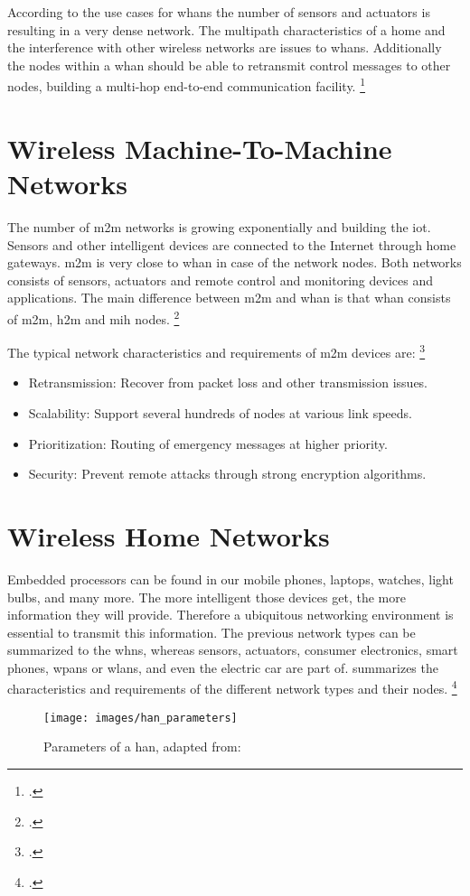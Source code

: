 According to the use cases for \glspl{whan} the number of sensors and actuators is resulting in a very dense network. The multipath characteristics of a home and the interference with other wireless networks are issues to \glspl{whan}. Additionally the nodes within a \gls{whan} should be able to retransmit control messages to other nodes, building a multi-hop end-to-end communication facility. \footcite[Cf.][]{Gomez2010}

\section{Wireless Machine-To-Machine Networks}

The number of \gls{m2m} networks is growing exponentially and building the \gls{iot}. Sensors and other intelligent devices are connected to the Internet through home gateways. \gls{m2m} is very close to \gls{whan} in case of the network nodes. Both networks consists of sensors, actuators and remote control and monitoring devices and applications. The main difference between \gls{m2m} and \gls{whan} is that \gls{whan} consists of \gls{m2m}, \gls{h2m} and \gls{mih} nodes. \footcite[Cf.][]{Jara2013}

The typical network characteristics and requirements of \gls{m2m} devices are: \footcite[Cf.][]{Minoli2013}

\begin{itemize}
  \item Retransmission: Recover from packet loss and other transmission issues.
  \item Scalability: Support several hundreds of nodes at various link speeds.
  \item Prioritization: Routing of emergency messages at higher priority.
  \item Security: Prevent remote attacks through strong encryption algorithms.
\end{itemize}

\section{Wireless Home Networks}

Embedded processors can be found in our mobile phones, laptops, watches, light bulbs, and many more. The more intelligent those devices get, the more information they will provide. Therefore a ubiquitous networking environment is essential to transmit this information. The previous network types can be summarized to the \glspl{whn}, whereas sensors, actuators, consumer electronics, smart phones, \glspl{wpan} or \glspl{wlan}, and even the electric car are part of.  summarizes the characteristics and requirements of the different network types and their nodes. \footcite[Cf.][7286--7290]{Mendes2015}

\begin{figure}[ht]
  \centering
  \texttt{[image: images/han\_parameters]}
  \caption{Parameters of a \gls{han}, adapted from: \cite[7290]{Mendes2015}}
  \label{fig:home_network_parameters}
\end{figure}
